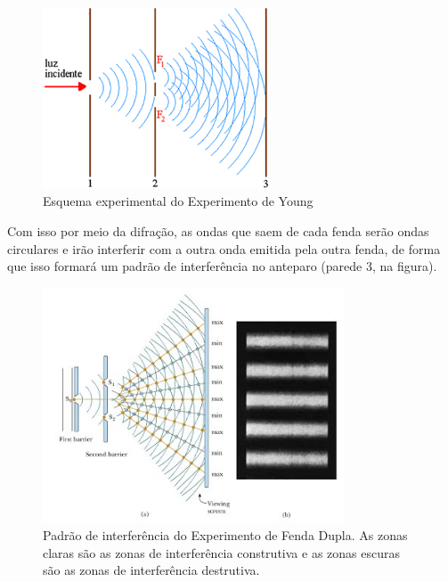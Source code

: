 \documentclass[12pt]{extarticle}
\newcommand{\<}{\langle}
\renewcommand{\>}{\rangle}
\theoremstyle{definition}
\begin{document}
\begin{figure}[H]
    \centering
    \includegraphics[width=0.6\textwidth]{fenda_dupla.jpg}
    \caption{Esquema experimental do Experimento de Young}
    \label{fig:Young}
\end{figure}
Com isso por meio da difração, as ondas que saem de cada fenda serão ondas circulares e irão interferir com a outra onda emitida pela outra fenda, de forma que isso formará um padrão de interferência no anteparo (parede 3, na figura).
\begin{figure}[H]
    \centering
    \includegraphics[width=0.8\textwidth]{young_2.jpg}
    \caption{Padrão de interferência do Experimento de Fenda Dupla. As zonas claras são as zonas de interferência construtiva e as zonas escuras são as zonas de interferência destrutiva.}
    \label{fig:young_interferencia}
\end{figure}
\end{document}
